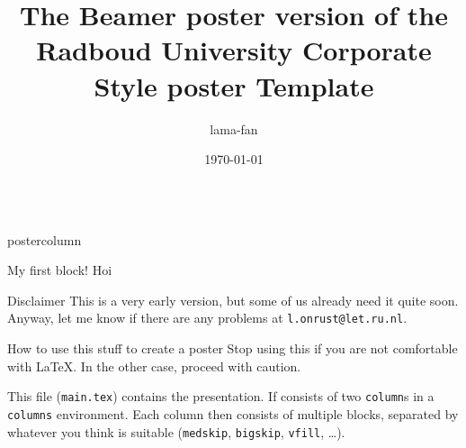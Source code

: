 \documentclass[roundedcorners=true, titleposition=left]{beamerthemeruhuisstijlposter}
\institute[CLS]{Centre for Language Studies, Radboud University Nijmegen, Nijmegen, the Netherlands}
\title{The Beamer poster version of the Radboud University Corporate Style poster Template}
\date{\today}
\author{lama-fan}
\begin{document}
\begin{frame}
\begin{columns}
\begin{column}{0.19\textwidth}
\begin{beamercolorbox}[center, wd=\textwidth]{postercolumn}
\begin{minipage}[T]{0.95\textwidth}
\parbox[t][\columnheight]{\textwidth}{%
  \begin{block}{My first block!}
  	Hoi
  \end{block}
  \medskip
  \begin{block}{Disclaimer}
  	This is a very early version, but some of us already need it quite soon. Anyway, let me know if there are any problems at \texttt{l.onrust@let.ru.nl}.
  \end{block}
 	\medskip
    \begin{block}{How to use this stuff to create a poster}
    	Stop using this if you are not comfortable with \LaTeX. In the other case, proceed with caution.
        
        This file (\texttt{main.tex}) contains the presentation. If consists of two \texttt{column}s in a \texttt{columns} environment. Each column then consists of multiple blocks, separated by whatever you think is suitable (\texttt{medskip}, \texttt{bigskip}, \texttt{vfill}, \ldots). 
    \end{block}
}
\end{minipage}
\end{beamercolorbox}
\end{column}


\end{columns}
\end{frame}
\end{document}
